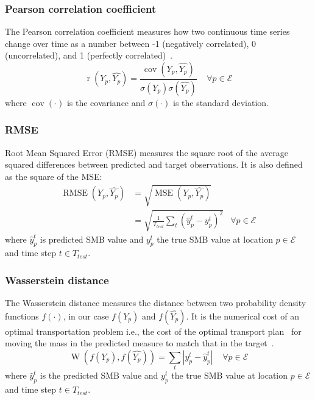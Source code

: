 \documentclass[a4paper,11pt,oneside]{report}
\begin{document}
\subsubsection{Pearson correlation coefficient}\label{subsubsec:pearson-corr}
The Pearson correlation coefficient measures how two continuous time series change over time as a number between -1 (negatively correlated), 0 (uncorrelated), and 1 (perfectly correlated)~\cite{Pearson}.
\begin{equation}
    \operatorname{r}\left(Y_{p},\widehat{Y_{p}}\right) = \frac{\operatorname{cov}(Y_{p},\widehat{Y_{p}})}{\sigma(Y_{p})\sigma(\widehat{Y_{p}})} \;\;\;\; \forall p \in \mathcal{E} 
\end{equation}
where $\operatorname {cov}(\cdot)$  is the covariance and  $\sigma(\cdot)$ is the standard deviation.

\subsubsection{RMSE}\label{subsubsec:rmse}
Root Mean Squared Error (RMSE) measures the square root of the average squared differences between predicted and target observations. It is also defined as the square of the MSE:
\begin{align}\label{eq:RMSE}
        \operatorname{RMSE}\left(Y_{p},\widehat{Y_{p}}\right) & = \sqrt{\operatorname{MSE}\left(Y_{p},\widehat{Y_{p}}\right)} \\ & = \sqrt{\frac{1}{T_{test}}\sum_{t}(\hat{y}_{p}^{t}-y^{t}_{p})^2} & \forall p \in \mathcal{E} 
\end{align}
where $\hat{y}_{p}^{t}$ is predicted SMB value and $y^{t}_{p}$ the true SMB value at location $p\in \mathcal{E} $ and time step $t\in T_{test}$. 

\subsubsection{Wasserstein distance}\label{subsubsec:wasserstein}
The Wasserstein distance measures the distance between two probability density functions $f(\cdotp)$, in our case $f(Y_p)$ and $f(\widehat{Y_p})$. It is the numerical cost of an optimal transportation problem i.e., the cost of the optimal transport plan~\cite{villani} for moving the mass in the predicted
measure to match that in the target~\cite{wasserstein1}. 
\begin{equation}
    \operatorname{W}\left(f(Y_p),f(\widehat{Y_p})\right) = \sum_{t}|y^{t}_{p}-\hat{y}_{p}^{t}| \;\;\;\; \forall p \in \mathcal{E}
\end{equation}
where $\hat{y}_{p}^{t}$ is the predicted SMB value and $y^{t}_{p}$ the true SMB value at location $p\in \mathcal{E} $ and time step $t\in T_{test}$. 
\end{document}

